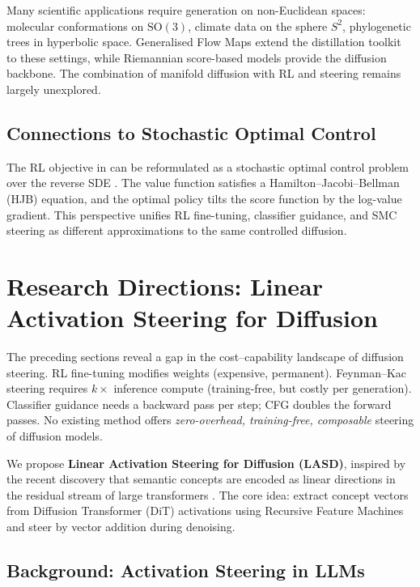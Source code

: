 \documentclass[11pt]{article}
\begin{document}
Many scientific applications require generation on non-Euclidean spaces: molecular conformations on $\mathrm{SO}(3)$, climate data on the sphere $S^2$, phylogenetic trees in hyperbolic space.
Generalised Flow Maps \citep{davis2025gfm} extend the distillation toolkit to these settings, while Riemannian score-based models \citep{debortoli2022riemannian} provide the diffusion backbone.
The combination of manifold diffusion with RL and steering remains largely unexplored.

\subsection{Connections to Stochastic Optimal Control}

The RL objective in  can be reformulated as a stochastic optimal control problem over the reverse SDE \citep{uehara2024finetuning,berner2022optimal}.
The value function satisfies a Hamilton--Jacobi--Bellman (HJB) equation, and the optimal policy tilts the score function by the log-value gradient.
This perspective unifies RL fine-tuning, classifier guidance, and SMC steering as different approximations to the same controlled diffusion.

\section{Research Directions: Linear Activation Steering for Diffusion}
\label{sec:lasd}

The preceding sections reveal a gap in the cost--capability landscape of diffusion steering.
RL fine-tuning modifies weights (expensive, permanent).
Feynman--Kac steering requires $k\times$ inference compute (training-free, but costly per generation).
Classifier guidance needs a backward pass per step; CFG doubles the forward passes.
No existing method offers \emph{zero-overhead, training-free, composable} steering of diffusion models.

We propose \textbf{Linear Activation Steering for Diffusion (LASD)}, inspired by the recent discovery that semantic concepts are encoded as linear directions in the residual stream of large transformers \citep{beaglehole2026universal}.
The core idea: extract concept vectors from Diffusion Transformer (DiT) activations using Recursive Feature Machines and steer by vector addition during denoising.

\subsection{Background: Activation Steering in LLMs}
\end{document}
